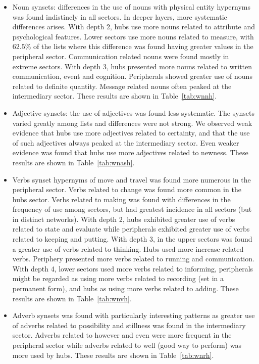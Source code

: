 \begin{itemize}
	\item Noun synsets: differences in the use of nouns with physical entity hypernyms was found indistincly in all sectors.
		In deeper layers, more systematic differences arises.
		With depth 2, hubs use more nouns related to attribute and psychological features.
		Lower sectors use more nouns related to measure,
		with $62.5\%$ of the lists where this difference was found having greater values in the peripheral sector.
		Communication related nouns were found mostly in extreme sectors.
		With depth 3, hubs presented more nouns related to written communication, event and cognition.
		Peripherals showed greater use of nouns related to definite quantity.
		Message related nouns often peaked at the intermediary sector.
		These results are shown in Table~\ref{tab:wnnh}.
\FloatBarrier
	\item Adjective synsets: the use of adjectives was found less systematic.
		The synsets varied greatly among lists and differences were not strong.
		We observed weak evidence that hubs use more adjectives related to certainty,
		and that the use of such adjectives always peaked at the intermediary sector.
		Even weaker evidence was found that hubs use more adjectives related to newness.
		These results are shown in Table~\ref{tab:wnash}.
\FloatBarrier
	\item Verbs synset hypernyms of move and travel was found more numerous in the peripheral sector.
		Verbs related to change was found more common in the hubs sector.
		Verbs related to making was found with differences in the frequency of use among sectors,
		but had greatest incidence in all sectors (but in distinct networks).
		With depth 2, hubs exhibited greater use of verbs related to state and evaluate while
		peripherals exhibited greater use of verbs related to keeping and putting.
		With depth 3, in the upper sectors was found a greater use of verbs related to thinking.
		Hubs used more increase-related verbs.
		Periphery presented more verbs related to running and communication.
		With depth 4, lower sectors used more verbs related to informing, peripherals might be regarded as using more verbs related to recording (set in a permanent form), and hubs as using more verbs related to adding.
		These results are shown in Table~\ref{tab:wnvh}.
\FloatBarrier
	\item Adverb synsets was found with particularly interesting patterns as greater use of adverbs related to possibility and stillness was found in the intermediary sector.
		Adverbs related to however and even were more frequent in the peripheral sector while adverbs related to well (good way to perform) was more used by hubs.
		These results are shown in Table~\ref{tab:wnrh}.
\FloatBarrier
\end{itemize}

